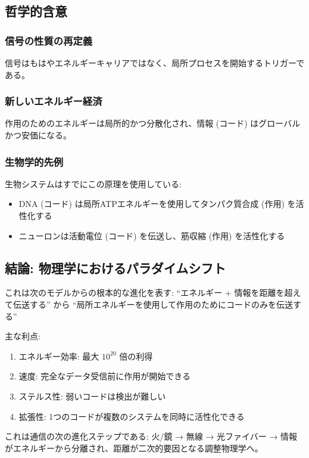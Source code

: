 \documentclass[11pt,a4paper]{article}
\begin{document}
	\subsection{哲学的含意}
	
	\subsubsection{信号の性質の再定義}
	信号はもはやエネルギーキャリアではなく、局所プロセスを開始するトリガーである。
	
	\subsubsection{新しいエネルギー経済}
	作用のためのエネルギーは局所的かつ分散化され、情報 (コード) はグローバルかつ安価になる。
	
	\subsubsection{生物学的先例}
	生物システムはすでにこの原理を使用している:
	\begin{itemize}
		\item DNA (コード) は局所ATPエネルギーを使用してタンパク質合成 (作用) を活性化する
		\item ニューロンは活動電位 (コード) を伝送し、筋収縮 (作用) を活性化する
	\end{itemize}
	
	\subsection{結論: 物理学におけるパラダイムシフト}
	
	これは次のモデルからの根本的な進化を表す:
	``エネルギー + 情報を距離を超えて伝送する''
	から
	``局所エネルギーを使用して作用のためにコードのみを伝送する''
	
	主な利点:
	\begin{enumerate}
		\item エネルギー効率: 最大 $10^{20}$ 倍の利得
		\item 速度: 完全なデータ受信前に作用が開始できる
		\item ステルス性: 弱いコードは検出が難しい
		\item 拡張性: 1つのコードが複数のシステムを同時に活性化できる
	\end{enumerate}
	
	これは通信の次の進化ステップである: 火/鏡 → 無線 → 光ファイバー → 情報がエネルギーから分離され、距離が二次的要因となる調整物理学へ。
	
\end{document}
